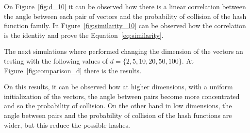 \documentclass{ethz_report}
\begin{document}
On Figure~\ref{fig:d_10} it can be observed how there is a linear correlation between the angle between each pair of vectors and the probability of collision of the hash function family.
In Figure~\ref{fig:similarity_10} can be observed how the correlation is the identity and prove the Equation~\ref{eq:similarity}.

The next simulations where performed changing the dimension of the vectors an testing with the following values of $d = \{2, 5, 10, 20, 50, 100\}$. At Figure~\ref{fig:comparison_d} there is the results.

On this results, it can be observed how at higher dimensions, with a uniform initialization of the vectors, the angle between pairs become more concentrated and so the probability of collision. On the other hand in low dimensions, the angle between pairs and the probability of collision of the hash functions are wider, but this reduce the possible hashes.
\end{document}
